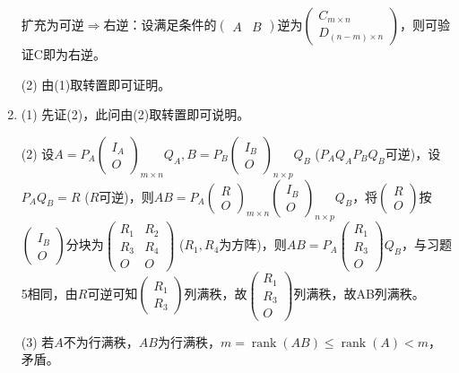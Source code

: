 \documentclass[a4paper,UTF8,fontset=windows]{ctexart}
\DeclareMathOperator{\rank}{rank}
\begin{document}
\begin{enumerate}
扩充为可逆$\Rightarrow$右逆：设满足条件的$\begin{pmatrix}A&B\end{pmatrix}$逆为$\begin{pmatrix}C_{m\times n}\\D_{(n-m)\times n}\end{pmatrix}$，则可验证C即为右逆。

(2) 由(1)取转置即可证明。

\item
(1) 先证(2)，此问由(2)取转置即可说明。

(2) 设$A=P_A\begin{pmatrix}I_A\\O\end{pmatrix}_{m\times n}Q_A,B=P_B\begin{pmatrix}I_B\\O\end{pmatrix}_{n\times p}Q_B$ ($P_AQ_AP_BQ_B$可逆)，设$P_AQ_B=R$ ($R$可逆)，则$AB=P_A\begin{pmatrix}R\\O\end{pmatrix}_{m\times n}\begin{pmatrix}I_B\\O\end{pmatrix}_{n\times p}Q_B$，将$\begin{pmatrix}R\\O\end{pmatrix}$按$\begin{pmatrix}I_B\\O\end{pmatrix}$分块为$\begin{pmatrix}R_1&R_2\\R_3&R_4\\O&O\end{pmatrix}$ ($R_1,R_4$为方阵)，则$AB=P_A\begin{pmatrix}R_1\\R_3\\O\end{pmatrix}Q_B$，与习题5相同，由$R$可逆可知$\begin{pmatrix}R_1\\R_3\end{pmatrix}$列满秩，故$\begin{pmatrix}R_1\\R_3\\O\end{pmatrix}$列满秩，故AB列满秩。

(3) 若$A$不为行满秩，$AB$为行满秩，$m=\rank(AB)\le\rank(A)<m$，矛盾。


\end{enumerate}
\end{document}
